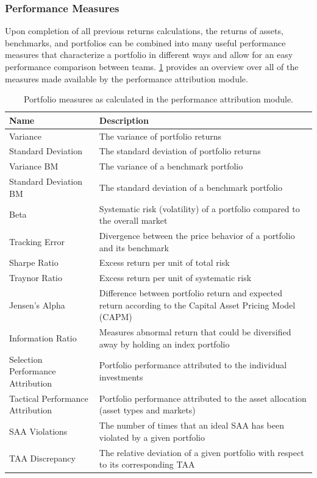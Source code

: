 \subsubsection{Performance Measures}
Upon completion of all previous returns calculations, the returns of assets, benchmarks, and portfolios can be combined into many useful performance measures that characterize a portfolio in different ways and allow for an easy performance comparison between teams. \cref{table:portfolio_measures} provides an overview over all of the measures made available by the performance attribution module.

\begin{table}[h!]
    \begin{tabular}{ll}
      \toprule
      Name & Description \\
      \midrule
      Variance     & The variance of portfolio returns \\
      Standard Deviation     & The standard deviation of portfolio returns \\
      Variance BM & The variance of a benchmark portfolio \\
      Standard Deviation BM & The standard deviation of a benchmark portfolio \\
      Beta & Systematic risk (volatility) of a portfolio compared to the overall market \\
      Tracking Error     & Divergence between the price behavior of a portfolio and its benchmark \\
      Sharpe Ratio     & Excess return per unit of total risk \\
      Traynor Ratio     & Excess return per unit of systematic risk \\
      Jensen's Alpha     & Difference between portfolio return and expected return according to the Capital Asset Pricing Model (CAPM) \\
      Information Ratio     & Measures abnormal return that could be diversified away by holding an index portfolio \\
      Selection Performance Attribution & Portfolio performance attributed to the individual investments \\
      Tactical Performance Attribution & Portfolio performance attributed to the asset allocation (asset types and markets) \\
      SAA Violations     & The number of times that an ideal SAA has been violated by a given portfolio \\
      TAA Discrepancy     & The relative deviation of a given portfolio with respect to its corresponding TAA \\
      \bottomrule
    \end{tabular}
    \centering
    \caption{Portfolio measures as calculated in the performance attribution module.}
    \label{table:portfolio_measures}
  \end{table}

